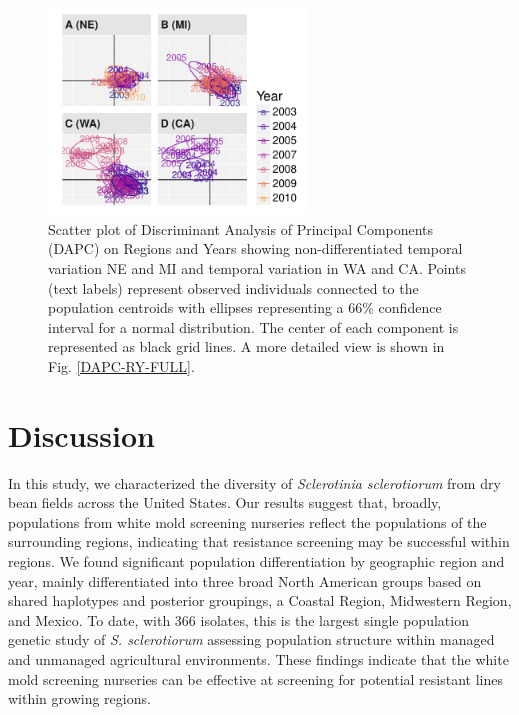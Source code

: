 \documentclass[fleqn,10pt,lineno]{wlpeerj} %
\theoremstyle{definition}
\theoremstyle{definition}
\theoremstyle{definition}
\theoremstyle{remark}
\begin{document}
\begin{figure}
\centering
\includegraphics[width=0.61000\textwidth]{../../results/figures/publication/dapc_region_year_micanewa.pdf}
\caption{Scatter plot of Discriminant Analysis of Principal Components
(DAPC) on Regions and Years showing non-differentiated temporal
variation NE and MI and temporal variation in WA and CA. Points (text
labels) represent observed individuals connected to the population
centroids with ellipses representing a 66\% confidence interval for a
normal distribution. The center of each component is represented as
black grid lines. A more detailed view is shown in Fig.
\ref{DAPC-RY-FULL}.}\label{DAPC-RY}
\end{figure}

\section*{Discussion}\label{discussion}

In this study, we characterized the diversity of \emph{Sclerotinia
sclerotiorum} from dry bean fields across the United States. Our results
suggest that, broadly, populations from white mold screening nurseries
reflect the populations of the surrounding regions, indicating that
resistance screening may be successful within regions. We found
significant population differentiation by geographic region and year,
mainly differentiated into three broad North American groups based on
shared haplotypes and posterior groupings, a Coastal Region, Midwestern
Region, and Mexico. To date, with 366 isolates, this is the largest
single population genetic study of \emph{S. sclerotiorum} assessing
population structure within managed and unmanaged agricultural
environments. These findings indicate that the white mold screening
nurseries can be effective at screening for potential resistant lines
within growing regions.
\end{document}
